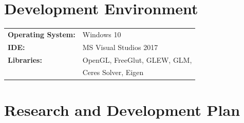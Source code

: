 \documentclass[10pt,twocolumn,letterpaper]{article}
\begin{document}
\section{Development Environment}
\begin{table}[h]
	\begin{tabular}{ll}
		\textbf{Operating System:} &  Windows 10  \\
		\textbf{IDE:} &  MS Visual Studios 2017  \\
		\textbf{Libraries:} &  OpenGL, FreeGlut, GLEW, GLM,\\
		&Ceres Solver, Eigen
	\end{tabular}
\end{table}

\section{Research and Development Plan}
\end{document}
